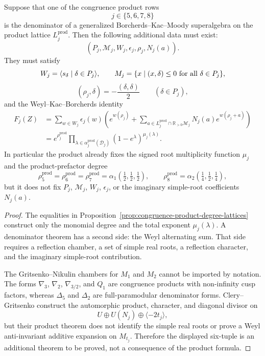 \documentclass[11pt]{memoir}
\newcommand{\R}{\mathbb{R}} \newcommand{\La}{\Lambda}
\begin{document}
\begin{proposition}
\label{prop:congruence-denominator-test}
Suppose that one of the congruence product rows
$$j\in\{5,6,7,8\}$$
is the denominator of a generalized Borcherds--Kac--Moody
superalgebra on the product lattice $L_j^{\mathrm{prod}}$.  Then the
following additional data must exist:
$$
\left(P_j,\mathcal M_j,W_j,\epsilon_j,\rho_j,N_j(a)\right).
$$
They must satisfy
$$
W_j=\langle s_\delta\mid\delta\in P_j\rangle,\qquad
\mathcal M_j=\{x\mid(x,\delta)\leq0\ \hbox{for all }\delta\in P_j\},
$$
$$
(\rho_j,\delta)=-\frac{(\delta,\delta)}{2}
\qquad(\delta\in P_j),
$$
and the Weyl--Kac--Borcherds identity
$$
\begin{aligned}
F_j(Z)
&=\sum_{w\in W_j}\epsilon_j(w)
\left(e^{w(\rho_j)}
+\sum_{a\in L_j^{\mathrm{prod}}\cap\R_{>0}\mathcal M_j}
N_j(a)e^{w(\rho_j+a)}\right)\\
&=e^{\rho_j^{\mathrm{prod}}}
\prod_{\lambda\in\alpha_j^{\mathrm{prod}}(\mathcal D_j)}
\left(1-e^\lambda\right)^{\mu_j(\lambda)}.
\end{aligned}
$$
In particular the product already fixes the signed root multiplicity
function $\mu_j$ and the product-prefactor degree
$$
\rho_5^{\mathrm{prod}}=\rho_6^{\mathrm{prod}}=\rho_7^{\mathrm{prod}}
=\alpha_1(\tfrac12,\tfrac12,\tfrac12),\qquad
\rho_8^{\mathrm{prod}}=\alpha_2(\tfrac14,\tfrac12,\tfrac14),
$$
but it does not fix $P_j$, $\mathcal M_j$, $W_j$, $\epsilon_j$, or the
imaginary simple-root coefficients $N_j(a)$.
\end{proposition}

\begin{proof}
The equalities in Proposition~\ref{prop:congruence-product-degree-lattices}
construct only the monomial degree and the total exponent
$\mu_j(\lambda)$.  A denominator theorem has a second side: the Weyl
alternating sum.  That side requires a reflection chamber, a set of
simple real roots, a reflection character, and the imaginary
simple-root contribution.

The Gritsenko--Nikulin chambers for $M_1$ and $M_2$ cannot be imported
by notation.  The forms $\nabla_3$, $\nabla_2$, $\nabla_{3/2}$, and
$Q_1$ are congruence products with non-infinity cusp factors, whereas
$\Delta_5$ and $\Delta_2$ are full-paramodular denominator forms.
Clery--Gritsenko construct the automorphic product, character, and
diagonal divisor on
$$U\oplus U(N_j)\oplus\langle-2t_j\rangle,$$
but their product theorem does not identify the simple real roots or
prove a Weyl anti-invariant additive expansion on $M_{t_j}$.  Therefore
the displayed six-tuple is an additional theorem to be proved, not a
consequence of the product formula.
\end{proof}
\end{document}
